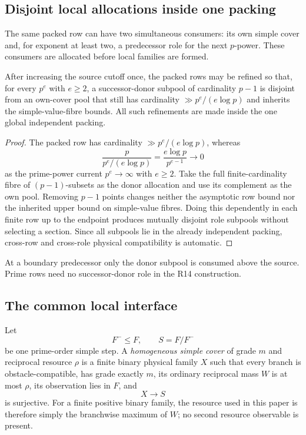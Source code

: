 \subsection{Disjoint local allocations inside one packing}

The same packed row can have two simultaneous consumers: its own simple cover
and, for exponent at least two, a predecessor role for the next $p$-power.
These consumers are allocated before local families are formed.

\begin{lemma}
\label{lem:disjoint-allocation}
After increasing the source cutoff once, the packed rows may be refined so
that, for every $p^e$ with $e\ge2$, a successor-donor subpool of cardinality
$p-1$ is disjoint from an own-cover pool that still has cardinality
$\gg p^e/(e\log p)$ and inherits the simple-value-fibre bounds.  All such
refinements are made inside the one global independent packing.
\end{lemma}

\begin{proof}
The packed row has cardinality $\gg p^e/(e\log p)$, whereas
\[
\frac{p}{p^e/(e\log p)}
=\frac{e\log p}{p^{e-1}}
\longrightarrow0
\]
as the prime-power current $p^e\to\infty$ with $e\ge2$.  Take the full
finite-cardinality fibre of $(p-1)$-subsets as the donor allocation and use its
complement as the own pool.  Removing $p-1$ points changes neither the
asymptotic row bound nor the inherited upper bound on simple-value fibres.
Doing this dependently in each finite row up to the endpoint produces mutually
disjoint role subpools without selecting a section.  Since all subpools lie in
the already independent packing, cross-row and cross-role physical
compatibility is automatic.
\end{proof}

At a boundary predecessor only the donor subpool is consumed above the source.
Prime rows need no successor-donor role in the R14 construction.

\subsection{The common local interface}

Let
\[
F^-\le F,
\qquad S=F/F^-
\]
be one prime-order simple step.  A \emph{homogeneous simple cover} of grade
$m$ and reciprocal resource $\rho$ is a finite binary physical family $X$
such that every branch is obstacle-compatible, has grade exactly $m$, its
ordinary reciprocal mass $W$ is at most $\rho$, its observation lies in $F$,
and
\[
X\longrightarrow S
\]
is surjective.  For a finite positive binary family, the resource used in this
paper is therefore simply the branchwise maximum of $W$; no second resource
observable is present.

